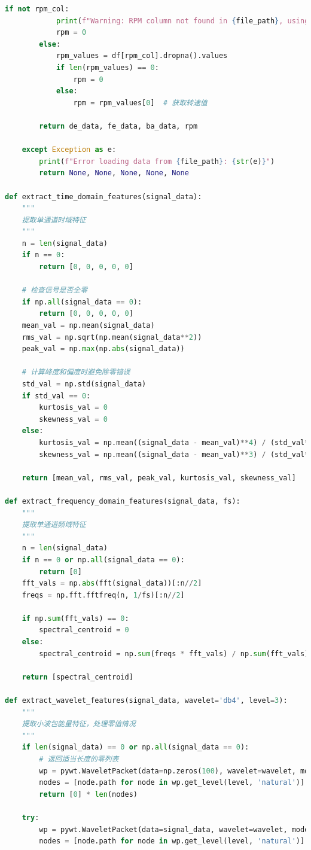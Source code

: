 \documentclass[a4paper]{CPIPC}
\numberwithin{equation}{section}
\begin{document}
\begin{lstlisting}[language=Python, caption=Feature Extraction]
        if not rpm_col:
            print(f"Warning: RPM column not found in {file_path}, using default 0")
            rpm = 0
        else:
            rpm_values = df[rpm_col].dropna().values
            if len(rpm_values) == 0:
                rpm = 0
            else:
                rpm = rpm_values[0]  # 获取转速值
        
        return de_data, fe_data, ba_data, rpm
        
    except Exception as e:
        print(f"Error loading data from {file_path}: {str(e)}")
        return None, None, None, None, None

def extract_time_domain_features(signal_data):
    """
    提取单通道时域特征
    """
    n = len(signal_data)
    if n == 0:
        return [0, 0, 0, 0, 0]
    
    # 检查信号是否全零
    if np.all(signal_data == 0):
        return [0, 0, 0, 0, 0]
    mean_val = np.mean(signal_data)
    rms_val = np.sqrt(np.mean(signal_data**2))
    peak_val = np.max(np.abs(signal_data))

    # 计算峰度和偏度时避免除零错误
    std_val = np.std(signal_data)
    if std_val == 0:
        kurtosis_val = 0
        skewness_val = 0
    else:
        kurtosis_val = np.mean((signal_data - mean_val)**4) / (std_val**4)
        skewness_val = np.mean((signal_data - mean_val)**3) / (std_val**3)
    
    return [mean_val, rms_val, peak_val, kurtosis_val, skewness_val]

def extract_frequency_domain_features(signal_data, fs):
    """
    提取单通道频域特征
    """
    n = len(signal_data)
    if n == 0 or np.all(signal_data == 0):
        return [0]
    fft_vals = np.abs(fft(signal_data))[:n//2]
    freqs = np.fft.fftfreq(n, 1/fs)[:n//2]
    
    if np.sum(fft_vals) == 0:
        spectral_centroid = 0
    else:
        spectral_centroid = np.sum(freqs * fft_vals) / np.sum(fft_vals)
    
    return [spectral_centroid]

def extract_wavelet_features(signal_data, wavelet='db4', level=3):
    """
    提取小波包能量特征，处理零值情况
    """
    if len(signal_data) == 0 or np.all(signal_data == 0):
        # 返回适当长度的零列表
        wp = pywt.WaveletPacket(data=np.zeros(100), wavelet=wavelet, mode='symmetric', maxlevel=level)
        nodes = [node.path for node in wp.get_level(level, 'natural')]
        return [0] * len(nodes)
    
    try:
        wp = pywt.WaveletPacket(data=signal_data, wavelet=wavelet, mode='symmetric', maxlevel=level)
        nodes = [node.path for node in wp.get_level(level, 'natural')]
        

\end{lstlisting}
\end{document}
